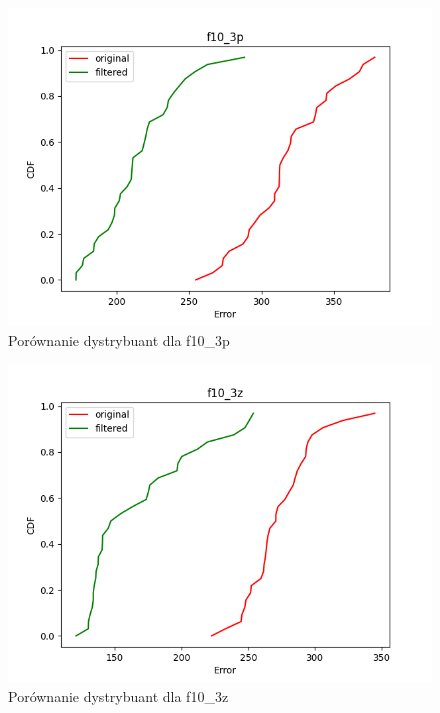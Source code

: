 \documentclass{classrep}
\begin{document}
{\begin{figure}[!htbp]
            \centering
            \includegraphics[width=\textwidth, width=90mm]{comparison_f10_3p.png}
            \caption{Porównanie dystrybuant dla f10\_3p}
            \label{comparison_f10_3p}
    \end{figure}

\begin{figure}[!htbp]
            \centering
            \includegraphics[width=\textwidth, width=90mm]{comparison_f10_3z.png}
            \caption{Porównanie dystrybuant dla f10\_3z}
            \label{comparison_f10_3z}
    \end{figure}

}
\end{document}
